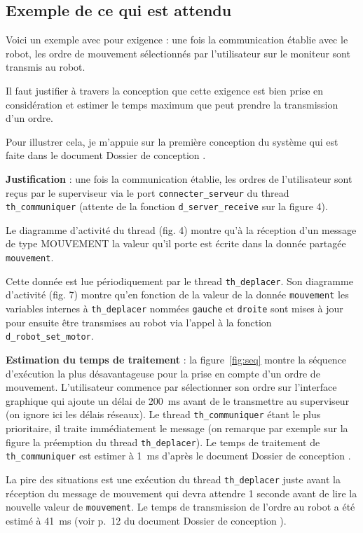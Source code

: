 \documentclass[11pt, a4paper]{paper}
\begin{document}
{\color{red} \subsection*{Exemple de ce qui est attendu}

Voici un exemple avec pour exigence : \og une fois la communication établie avec le robot, les ordre de mouvement sélectionnés par l'utilisateur sur le moniteur sont transmis au robot.\fg\ 

Il faut justifier à travers la conception que cette exigence est bien prise en considération et estimer le temps maximum que peut prendre la transmission d'un ordre.

Pour illustrer cela, je m'appuie sur la première conception du système qui est faite  dans le document \og Dossier de conception \fg.

{\bf Justification} : une fois la communication établie, les ordres de l'utilisateur sont reçus par le superviseur via le port {\tt connecter\_serveur} du thread {\tt th\_communiquer} (attente de la fonction {\tt d\_server\_receive} sur la figure 4).

Le diagramme d'activité du thread (fig. 4) montre qu'à la réception d'un message de type MOUVEMENT la valeur qu'il porte est écrite dans la donnée partagée {\tt mouvement}. 

Cette donnée est lue périodiquement par le thread {\tt th\_deplacer}. Son diagramme d'activité (fig. 7) montre qu'en fonction de la valeur de la donnée {\tt mouvement} les variables  internes à {\tt th\_deplacer} nommées {\tt gauche} et {\tt droite} sont mises à jour pour ensuite être transmises au robot via l'appel à la fonction {\tt d\_robot\_set\_motor}.

{\bf Estimation du temps de traitement} : la figure~\ref{fig:seq} montre la séquence d'exécution la plus désavantageuse pour la prise en compte d'un ordre de mouvement. L'utilisateur commence par sélectionner son ordre sur l'interface graphique qui ajoute un délai de 200~ms avant de le transmettre au superviseur (on ignore ici les délais réseaux). Le thread {\tt th\_communiquer} étant le plus prioritaire, il traite immédiatement le message (on remarque par exemple sur la figure la préemption du thread {\tt th\_deplacer}). Le temps de traitement de {\tt th\_communiquer} est estimer à 1~ms d'après le document \og Dossier de conception \fg.

La pire des situations est une exécution du thread {\tt th\_deplacer} juste avant la réception du message de mouvement qui devra attendre 1 seconde avant de lire la nouvelle valeur de {\tt mouvement}. Le temps de transmission de l'ordre au robot a été estimé à 41~ms (voir p.~12 du document \og Dossier de conception \fg).

}
\end{document}
